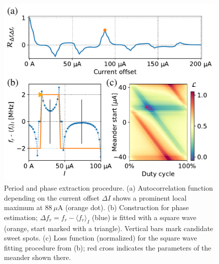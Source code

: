 \documentclass[%
 aip,
 draft,
 amsmath,amssymb,
 reprint,%
]{revtex4-1}
\begin{document}
\begin{figure}
	\centering
	\includegraphics[width=\linewidth]{per+phase}
	\caption{Period and phase extraction procedure. (a) Autocorrelation function depending on the current offset $\Delta I$ shows a prominent local maximum at $88\ \mu$A (orange dot). (b) Construction for phase estimation; $\Delta f_r = f_r-\langle f_r \rangle_{I}$ (blue) is fitted with a square wave (orange, start marked with a triangle). Vertical bars mark candidate sweet spots. (c) Loss function (normalized) for the square wave fitting procedure from (b); red cross indicates the parameters of the meander shown there.}
	\label{fig:per+phase}
\end{figure}
\end{document}
